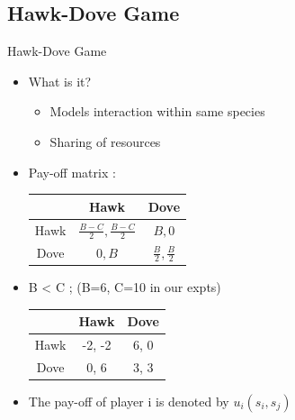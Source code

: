 \documentclass{IFES-beamer}
\begin{document}
    \subsection{Hawk-Dove Game}
        \begin{frame}{Hawk-Dove Game}
            \begin{itemize}
                \item What is it?
                    \begin{itemize}
                        \item Models interaction within same species
                        \item Sharing of resources
                    \end{itemize}
                \item Pay-off matrix : \\
                    \begin{table}[H]
                      \begin{center}
                        \begin{tabular}{|c|c|c|} %
                        \hline
                        & Hawk & Dove\\
                          \hline
                          Hawk & $\frac{B-C}{2}, \frac{B-C}{2}$ & $B, 0$ \\
                          \hline
                          Dove & $0, B$ & $\frac{B}{2}, \frac{B}{2}$ \\
                          \hline
                        \end{tabular}
                      \end{center}
                    \end{table}
                \item B < C ; (B=6, C=10 in our expts)
                    \begin{table}[H]
                      \begin{center}
                        \begin{tabular}{|c|c|c|} %
                        \hline
                        & Hawk & Dove\\
                          \hline
                          Hawk & -2, -2 & 6, 0 \\
                          \hline
                          Dove & 0, 6 & 3, 3 \\
                          \hline
                        \end{tabular}
                      \end{center}
                    \end{table}
                \item The pay-off of player i is denoted by $u_i(s_i, s_j)$
            \end{itemize}
        \end{frame}
    
\end{document}
